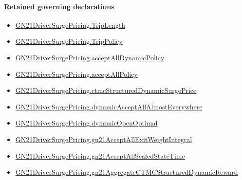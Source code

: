 \documentclass[10pt]{article}
\begin{document}
\paragraph{Retained governing declarations}
\begin{itemize}\raggedright
\item \hyperlink{governing-declaration-a616c143f22cf2bc}{GN21\allowbreak{}Driver\allowbreak{}Surge\allowbreak{}Pricing.\allowbreak{}Trip\allowbreak{}Length}
\item \hyperlink{governing-declaration-4312ad4cb899871f}{GN21\allowbreak{}Driver\allowbreak{}Surge\allowbreak{}Pricing.\allowbreak{}Trip\allowbreak{}Policy}
\item \hyperlink{governing-declaration-cbeef38fdd703fea}{GN21\allowbreak{}Driver\allowbreak{}Surge\allowbreak{}Pricing.\allowbreak{}accept\allowbreak{}All\allowbreak{}Dynamic\allowbreak{}Policy}
\item \hyperlink{governing-declaration-e94c9281d4f4b12d}{GN21\allowbreak{}Driver\allowbreak{}Surge\allowbreak{}Pricing.\allowbreak{}accept\allowbreak{}All\allowbreak{}Policy}
\item \hyperlink{governing-declaration-3b62568e695ff649}{GN21\allowbreak{}Driver\allowbreak{}Surge\allowbreak{}Pricing.\allowbreak{}ctmc\allowbreak{}Structured\allowbreak{}Dynamic\allowbreak{}Surge\allowbreak{}Price}
\item \hyperlink{governing-declaration-07d004cc631430b7}{GN21\allowbreak{}Driver\allowbreak{}Surge\allowbreak{}Pricing.\allowbreak{}dynamic\allowbreak{}Accept\allowbreak{}All\allowbreak{}Almost\allowbreak{}Everywhere}
\item \hyperlink{governing-declaration-abf3520e319b0ec7}{GN21\allowbreak{}Driver\allowbreak{}Surge\allowbreak{}Pricing.\allowbreak{}dynamic\allowbreak{}Open\allowbreak{}Optimal}
\item \hyperlink{governing-declaration-6c79d30667f94cc2}{GN21\allowbreak{}Driver\allowbreak{}Surge\allowbreak{}Pricing.\allowbreak{}gn21\allowbreak{}Accept\allowbreak{}All\allowbreak{}Exit\allowbreak{}Weight\allowbreak{}Integral}
\item \hyperlink{governing-declaration-108ece646f6d6b33}{GN21\allowbreak{}Driver\allowbreak{}Surge\allowbreak{}Pricing.\allowbreak{}gn21\allowbreak{}Accept\allowbreak{}All\allowbreak{}Scaled\allowbreak{}State\allowbreak{}Time}
\item \hyperlink{governing-declaration-3e329851d5ec65d2}{GN21\allowbreak{}Driver\allowbreak{}Surge\allowbreak{}Pricing.\allowbreak{}gn21\allowbreak{}Aggregate\allowbreak{}CTMC\allowbreak{}Structured\allowbreak{}Dynamic\allowbreak{}Reward}

\end{itemize}
\end{document}
